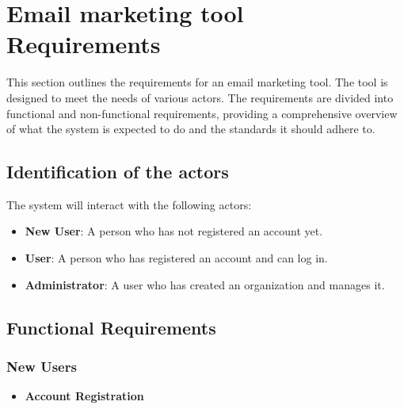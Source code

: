 \section{Email marketing tool Requirements}

This section outlines the requirements for an email marketing tool. The tool is designed to meet the needs of various actors. The requirements are divided into functional and non-functional requirements, providing a comprehensive overview of what the system is expected to do and the standards it should adhere to.

\subsection{Identification of the actors}
The system will interact with the following actors:
\begin{itemize}
\item \textbf{New User}: A person who has not registered an account yet.
\item \textbf{User}: A person who has registered an account and can log in.
\item \textbf{Administrator}: A user who has created an organization and manages it.
\end{itemize}

\subsection{Functional Requirements}

\subsubsection{New Users}
\begin{itemize}
    \item \textbf{Account Registration}
\end{itemize}

